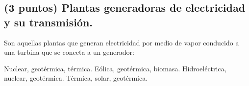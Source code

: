 \documentclass[12pt, letter]{exam}
\begin{document}
\begin{questions}
    \section{(3 puntos) Plantas generadoras de electricidad y su transmisión.}


    \question Son aquellas plantas que generan electricidad por medio de vapor conducido a una turbina que se conecta a un generador:
    \begin{multicols}{2}
    \begin{tasks}
        \task Nuclear, geotérmica, térmica.
        \task Eólica, geotérmica, biomasa.
        \task Hidroeléctrica, nuclear, geotérmica.
        \task Térmica, solar, geotérmica.
    \end{tasks}
    \end{multicols}


\end{questions}
\end{document}
